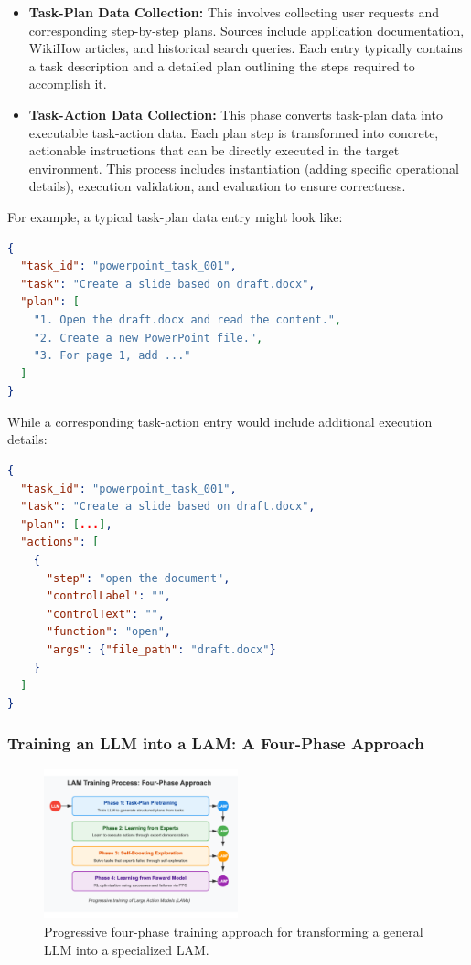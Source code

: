 \documentclass[journal,twoside,10pt]{IEEEtran}
\begin{document}
\begin{itemize}
    \item \textbf{Task-Plan Data Collection:} This involves collecting user requests and corresponding step-by-step plans. Sources include application documentation, WikiHow articles, and historical search queries. Each entry typically contains a task description and a detailed plan outlining the steps required to accomplish it.
    
    \item \textbf{Task-Action Data Collection:} This phase converts task-plan data into executable task-action data. Each plan step is transformed into concrete, actionable instructions that can be directly executed in the target environment. This process includes instantiation (adding specific operational details), execution validation, and evaluation to ensure correctness.
\end{itemize}

For example, a typical task-plan data entry might look like:

\begin{lstlisting}[language=JSON]
{
  "task_id": "powerpoint_task_001",
  "task": "Create a slide based on draft.docx",
  "plan": [
    "1. Open the draft.docx and read the content.",
    "2. Create a new PowerPoint file.",
    "3. For page 1, add ..."
  ]
}
\end{lstlisting}

While a corresponding task-action entry would include additional execution details:

\begin{lstlisting}[language=JSON]
{
  "task_id": "powerpoint_task_001",
  "task": "Create a slide based on draft.docx",
  "plan": [...],
  "actions": [
    {
      "step": "open the document",
      "controlLabel": "",
      "controlText": "",
      "function": "open",
      "args": {"file_path": "draft.docx"}
    }
  ]
}
\end{lstlisting}

\subsubsection{Training an LLM into a LAM: A Four-Phase Approach}

\begin{figure}[htbp]
    \centering
    \includegraphics[width=0.5\textwidth]{traning_phases.pdf}
    \caption{Progressive four-phase training approach for transforming a general LLM into a specialized LAM.}
    \label{fig:lam-training}
\end{figure}
\end{document}
